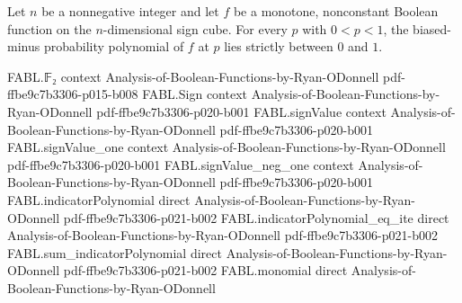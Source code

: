 \begin{theorem}
\label{FABL.biasedMinusProbabilityPolynomial_mem_Ioo}
\leanok
{}
Let $n$ be a nonnegative integer and let $f$ be a monotone, nonconstant Boolean function
on the $n$-dimensional sign cube. For every $p$ with $0<p<1$, the biased-minus
probability polynomial of $f$ at $p$ lies strictly between $0$ and $1$.
\end{theorem}

\begin{theorem}
\label{FABL.deriv_biasedMinusProbabilityPolynomial_ge_logistic}
\leanok
{}
\proofstep
  {FABL.𝔽₂}
  {context}
  {Analysis-of-Boolean-Functions-by-Ryan-ODonnell}
  {pdf-ffbe9c7b3306-p015-b008}
\proofstep
  {FABL.Sign}
  {context}
  {Analysis-of-Boolean-Functions-by-Ryan-ODonnell}
  {pdf-ffbe9c7b3306-p020-b001}
\proofstep
  {FABL.signValue}
  {context}
  {Analysis-of-Boolean-Functions-by-Ryan-ODonnell}
  {pdf-ffbe9c7b3306-p020-b001}
\proofstep
  {FABL.signValue_one}
  {context}
  {Analysis-of-Boolean-Functions-by-Ryan-ODonnell}
  {pdf-ffbe9c7b3306-p020-b001}
\proofstep
  {FABL.signValue_neg_one}
  {context}
  {Analysis-of-Boolean-Functions-by-Ryan-ODonnell}
  {pdf-ffbe9c7b3306-p020-b001}
\proofstep
  {FABL.indicatorPolynomial}
  {direct}
  {Analysis-of-Boolean-Functions-by-Ryan-ODonnell}
  {pdf-ffbe9c7b3306-p021-b002}
\proofstep
  {FABL.indicatorPolynomial_eq_ite}
  {direct}
  {Analysis-of-Boolean-Functions-by-Ryan-ODonnell}
  {pdf-ffbe9c7b3306-p021-b002}
\proofstep
  {FABL.sum_indicatorPolynomial}
  {direct}
  {Analysis-of-Boolean-Functions-by-Ryan-ODonnell}
  {pdf-ffbe9c7b3306-p021-b002}
\proofstep
  {FABL.monomial}
  {direct}
  {Analysis-of-Boolean-Functions-by-Ryan-ODonnell}

\end{theorem}
